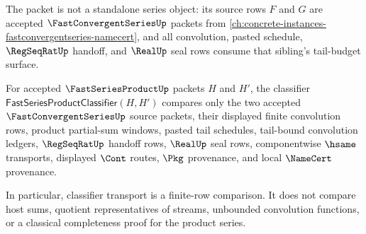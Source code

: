 The packet is not a standalone series object: its source rows $F$ and $G$ are accepted $\FastConvergentSeriesUp$ packets from \autoref{ch:concrete-instances-fastconvergentseries-namecert}, and all convolution, pasted schedule, $\RegSeqRatUp$ handoff, and $\RealUp$ seal rows consume that sibling's tail-budget surface.

\begin{definition}
\label{def:fast-series-product-classifier}
For accepted $\FastSeriesProductUp$ packets $H$ and $H'$, the classifier $\mathsf{FastSeriesProductClassifier}(H,H')$ compares only the two accepted $\FastConvergentSeriesUp$ source packets, their displayed finite convolution rows, product partial-sum windows, pasted tail schedules, tail-bound convolution ledgers, $\RegSeqRatUp$ handoff rows, $\RealUp$ seal rows, componentwise $\hsame$ transports, displayed $\Cont$ routes, $\Pkg$ provenance, and local $\NameCert$ provenance.

In particular, classifier transport is a finite-row comparison. It does not compare host sums, quotient representatives of streams, unbounded convolution functions, or a classical completeness proof for the product series.
\end{definition}

